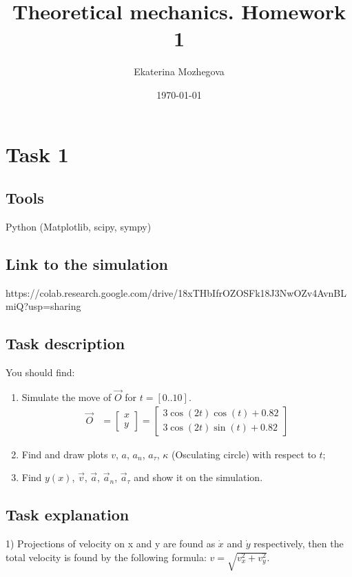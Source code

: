 \documentclass{article}
\title{Theoretical mechanics. Homework 1}
\author{Ekaterina Mozhegova}
\date{\today}
\begin{document}
\maketitle

\section{Task 1}

\subsection{Tools}

Python (Matplotlib, scipy, sympy)

\subsection{Link to the simulation}

https://colab.research.google.com/drive/18xTHbIfrOZOSFk18J3NwOZv4AvnBLmiQ?usp=sharing

\subsection{Task description}
You should find:
\begin{enumerate}
    \item Simulate the move of \(\vec{O}\) for \( t = [0..10] \).
    \begin{align*}
        \vec{O} &= \begin{bmatrix} x \\ y \end{bmatrix} = \begin{bmatrix} 3 \cos(2t) \cos(t) + 0.82 \\ 3 \cos(2t) \sin(t) + 0.82 \end{bmatrix}
    \end{align*}
    \item Find and draw plots \( v \), \( a \), \( a_n \), \( a_{\tau} \), \( \kappa \) (Osculating circle) with respect to \( t \); 
    \item Find \( y(x) \), \( \vec{v} \), \( \vec{a} \), \( \vec{a}_n \), \( \vec{a}_{\tau} \) and show it on the simulation.
\end{enumerate}

\subsection{Task explanation}
1) Projections of  velocity on x and y are found as $\dot x$ and $\dot y$ respectively, then the total velocity is found by the following formula: 
\(v = \sqrt{v_x^2 + v_y^2}\).
\end{document}
